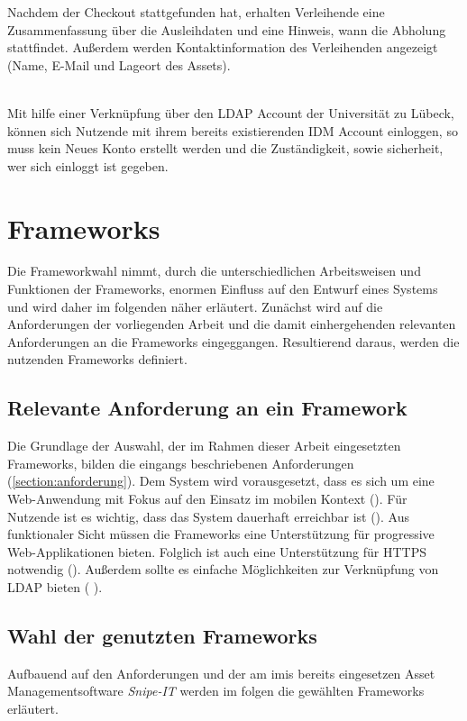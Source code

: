 Nachdem der Checkout stattgefunden hat, erhalten Verleihende eine
Zusammenfassung über die Ausleihdaten und eine  Hinweis, wann die Abholung
stattfindet. Außerdem werden Kontaktinformation des Verleihenden angezeigt
(Name, E-Mail und Lageort des Assets).


    {\sffamily\color{maincolor}{Ft-VA-4 | Authentifizierung per IDM Account}}\\
Mit hilfe einer Verknüpfung über den LDAP Account der Universität zu Lübeck,
können sich Nutzende mit ihrem bereits existierenden IDM Account einloggen, so
muss kein Neues Konto erstellt werden und die Zuständigkeit, sowie sicherheit,
wer sich einloggt ist gegeben.
\section{Frameworks}
\label{section:frameworks}
Die Frameworkwahl nimmt, durch die unterschiedlichen Arbeitsweisen und
Funktionen der Frameworks, enormen Einfluss auf den Entwurf eines Systems und
wird daher im folgenden näher erläutert. Zunächst wird auf die Anforderungen der
vorliegenden Arbeit und die damit einhergehenden relevanten Anforderungen an die
Frameworks eingeggangen. Resultierend daraus, werden die nutzenden Frameworks
definiert.

\subsection{Relevante Anforderung an ein Framework}
Die Grundlage der Auswahl, der im Rahmen dieser Arbeit eingesetzten Frameworks,
bilden die eingangs beschriebenen Anforderungen (\ref{section:anforderung}). Dem
System wird vorausgesetzt, dass es sich um eine Web-Anwendung mit Fokus auf den
Einsatz im mobilen Kontext (). Für Nutzende ist es
wichtig, dass das System dauerhaft erreichbar ist (). Aus
funktionaler Sicht müssen die Frameworks eine Unterstützung für progressive
Web-Applikationen bieten. Folglich ist auch eine Unterstützung für HTTPS
notwendig (). Außerdem sollte es einfache Möglichkeiten zur
Verknüpfung von LDAP bieten ( ).

\subsection{Wahl der genutzten Frameworks}
Aufbauend auf den Anforderungen und der am \ac{imis} bereits eingesetzen Asset
Managementsoftware \textit{Snipe-IT} werden im folgen die gewählten Frameworks
erläutert.


